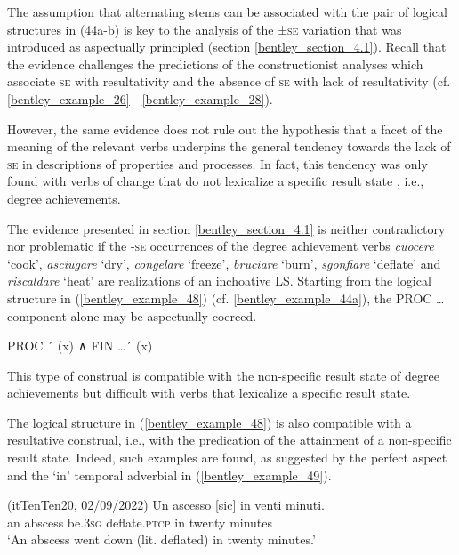 \documentclass[output=paper,colorlinks,citecolor=brown
]{langscibook}
\begin{document}
The assumption that alternating stems can be associated with the pair of logical structures in (44a-b) is key to the analysis of the ±\textsc{se} variation that was introduced as aspectually principled (section \ref{bentley_section_4.1}). Recall that the evidence challenges the predictions of the constructionist analyses which associate \textsc{se} with resultativity and the absence of \textsc{se} with lack of resultativity (cf. \ref{bentley_example_26}—\ref{bentley_example_28}). 

However, the same evidence does not rule out the hypothesis that a facet of the meaning of the relevant verbs underpins the general tendency towards the lack of \textsc{se} in descriptions of properties and processes. In fact, this tendency was only found with verbs of change that do not lexicalize a specific result state \citep{cennamo2012aspectual}, i.e., degree achievements. 

The evidence presented in section \ref{bentley_section_4.1} is neither contradictory nor problematic if the -\textsc{se} occurrences of the degree achievement verbs \textit{cuocere} ‘cook’, \textit{asciugare} ‘dry’, \textit{congelare} ‘freeze’, \textit{bruciare} ‘burn’, \textit{sgonfiare} ‘deflate’ and \textit{riscaldare} ‘heat’ are realizations of an inchoative LS. Starting from the logical structure in (\ref{bentley_example_48}) (cf. \ref{bentley_example_44a}), the PROC \ldots  component alone may be aspectually coerced. 

\ea \label{bentley_example_48}
    PROC ´ (x) ∧ FIN  \ldots {}´ (x)
\z

This type of construal is compatible with the non-specific result state of degree achievements but difficult with verbs that lexicalize a specific result state. 

The logical structure in (\ref{bentley_example_48}) is also compatible with a resultative construal, i.e., with the predication of the attainment of a non-specific result state. Indeed, such examples are found, as suggested by the perfect aspect and the ‘in’ temporal adverbial in (\ref{bentley_example_49}).


\hspace*{\fill}(itTenTen20, 02/09/2022)\quad
\ea \label{bentley_example_49}
    \gll Un ascesso	{ [sic]} 						in venti 			minuti. \\
    an	abscess be.3\textsc{sg}		deflate.\textsc{ptcp}		in	twenty		minutes \\
    \glt ‘An abscess went down (lit. deflated) in twenty minutes.’
\z
\end{document}
